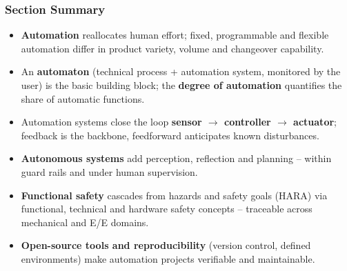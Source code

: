 \begin{frame}
	\frametitle{Section Summary}
	\begin{itemize}
		\item \textbf{Automation} reallocates human effort; fixed, programmable and flexible automation differ in product variety, volume and changeover capability.
		\item An \textbf{automaton} (technical process + automation system, monitored by the user) is the basic building block; the \textbf{degree of automation} quantifies the share of automatic functions.
		\item Automation systems close the loop \textbf{sensor $\rightarrow$ controller $\rightarrow$ actuator}; feedback is the backbone, feedforward anticipates known disturbances.
		\item \textbf{Autonomous systems} add perception, reflection and planning -- within guard rails and under human supervision.
		\item \textbf{Functional safety} cascades from hazards and safety goals (HARA) via functional, technical and hardware safety concepts -- traceable across mechanical and E/E domains.
		\item \textbf{Open-source tools and reproducibility} (version control, defined environments) make automation projects verifiable and maintainable.
	\end{itemize}
\end{frame}
